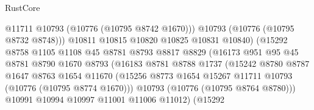 \begin{lexlean}{RustCore}
\begin{coremodule}
                                        @11711
                                        @10793
                                        (@10776 (@10795 @8742 @1670)))
                                      @10793
                                      (@10776 (@10795 @8732 @8748)))
                                    @10811
                                    @10815
                                    @10820
                                    @10825
                                    @10831
                                    @10840)
                                  (@15292
                                    @8758
                                    @1105
                                    @1108
                                    @45
                                    @8781
                                    @8793
                                    @8817
                                    @8829
                                    (@16173
                                      @951
                                      @95
                                      @45
                                      @8781
                                      @8790
                                      @1670
                                      @8793
                                      (@16183
                                        @8781
                                        @8788
                                        @1737
                                        (@15242
                                          @8780
                                          @8787
                                          @1647
                                          @8763
                                          @1654
                                          @11670
                                          (@15256
                                            @8773
                                            @1654
                                            @15267
                                            @11711
                                            @10793
                                            (@10776 (@10795 @8774 @1670)))
                                          @10793
                                          (@10776 (@10795 @8764 @8780)))
                                        @10991
                                        @10994
                                        @10997
                                        @11001
                                        @11006
                                        @11012)
                                      (@15292

\end{coremodule}
\end{lexlean}
